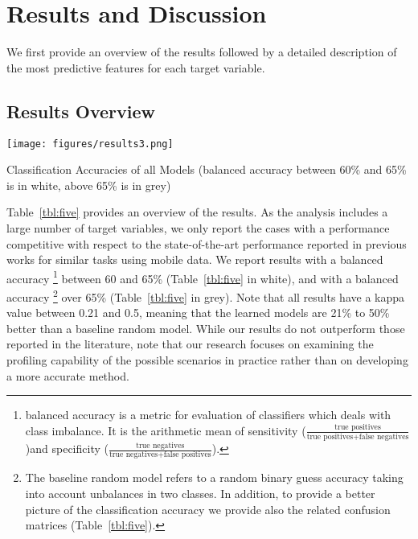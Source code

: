 \section{Results and Discussion}
We first provide an overview of the results followed by a detailed description of the most predictive features for each target variable. 

\subsection{Results Overview}

\begin{table}
  \texttt{[image: figures/results3.png]}
  \caption{Classification Accuracies of all Models (balanced accuracy between 60\% and 65\% is in white, above 65\% is in grey)}
  \label{tbl:five}
\end{table}

Table~\ref{tbl:five} provides an overview of the results. As the analysis includes a large number of target variables, we only report the cases with a performance competitive with respect to the state-of-the-art performance reported in previous works for similar tasks using mobile data. We report results with a balanced accuracy \footnote{balanced accuracy is a metric for evaluation of classifiers which deals with class imbalance. It is the arithmetic mean of sensitivity ($\frac{\text{true positives}}{\text{true positives} + \text{false negatives}}$)and specificity ($\frac{\text{true negatives}}{\text{true negatives} + \text{false positives}}$).}
between 60 and 65\% (Table~\ref{tbl:five} in white), and with a balanced accuracy
\footnote{The baseline random model refers to a random binary guess accuracy taking into account unbalances in two classes. In addition, to provide a better picture of the classification accuracy we provide also the related confusion matrices (Table~\ref{tbl:five}).
} over 65\% (Table~\ref{tbl:five} in grey). Note that all results have a kappa value between 0.21 and 0.5, meaning that the learned models are 21\% to 50\% better than a baseline random model. While our results do not outperform those reported in the literature, note that our research focuses on examining the profiling capability of the possible scenarios in practice rather than on developing a more accurate method. 


